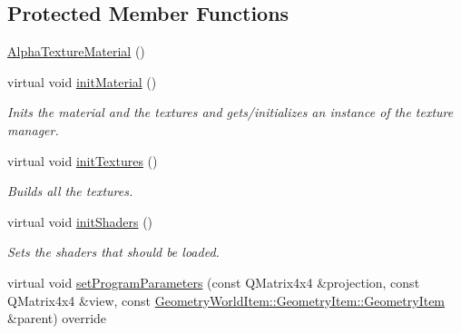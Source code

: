 \subsection*{Protected Member Functions}
\begin{DoxyCompactItemize}
\item 
\mbox{\hyperlink{class_geometry_engine_1_1_geometry_material_1_1_alpha_texture_material_a023098f115cb229cbfe01734bac5bb27}{Alpha\+Texture\+Material}} ()
\item 
\mbox{\label{class_geometry_engine_1_1_geometry_material_1_1_alpha_texture_material_a9ab3d5b65fe7cf1c5e5d9f088d9707a9}} 
virtual void \mbox{\hyperlink{class_geometry_engine_1_1_geometry_material_1_1_alpha_texture_material_a9ab3d5b65fe7cf1c5e5d9f088d9707a9}{init\+Material}} ()
\begin{DoxyCompactList}\small\item\em Inits the material and the textures and gets/initializes an instance of the texture manager. \end{DoxyCompactList}\item 
\mbox{\label{class_geometry_engine_1_1_geometry_material_1_1_alpha_texture_material_a567d63bb5983be6f0466b0a6640d14ef}} 
virtual void \mbox{\hyperlink{class_geometry_engine_1_1_geometry_material_1_1_alpha_texture_material_a567d63bb5983be6f0466b0a6640d14ef}{init\+Textures}} ()
\begin{DoxyCompactList}\small\item\em Builds all the textures. \end{DoxyCompactList}\item 
\mbox{\label{class_geometry_engine_1_1_geometry_material_1_1_alpha_texture_material_a279169a491dbe5680dc3eeeb5baa447c}} 
virtual void \mbox{\hyperlink{class_geometry_engine_1_1_geometry_material_1_1_alpha_texture_material_a279169a491dbe5680dc3eeeb5baa447c}{init\+Shaders}} ()
\begin{DoxyCompactList}\small\item\em Sets the shaders that should be loaded. \end{DoxyCompactList}\item 
virtual void \mbox{\hyperlink{class_geometry_engine_1_1_geometry_material_1_1_alpha_texture_material_aba7adf21a4bc2bb34f8a16d0008ed64e}{set\+Program\+Parameters}} (const Q\+Matrix4x4 \&projection, const Q\+Matrix4x4 \&view, const \mbox{\hyperlink{class_geometry_engine_1_1_geometry_world_item_1_1_geometry_item_1_1_geometry_item}{Geometry\+World\+Item\+::\+Geometry\+Item\+::\+Geometry\+Item}} \&parent) override

\end{DoxyCompactItemize}
